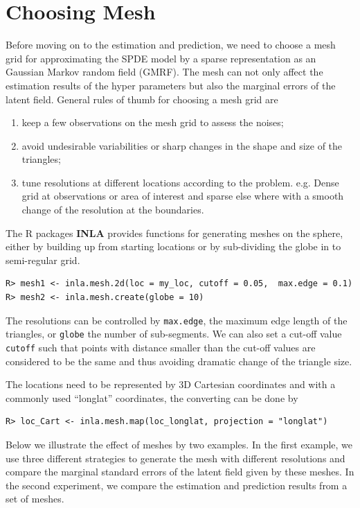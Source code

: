 \documentclass[a4paper,12pt]{article}
\begin{document}
\section{Choosing Mesh}
Before moving on to the estimation and prediction, we need to choose a mesh grid for approximating the SPDE model by a sparse representation as an Gaussian Markov random field (GMRF). The mesh can not only affect the estimation results of the hyper parameters but also the marginal errors of the latent field. General rules of thumb for choosing a mesh grid are 
\begin{enumerate}
\item keep a few observations on the mesh grid to assess the noises;
\item avoid undesirable variabilities or sharp changes in the shape and size of the triangles;
\item tune resolutions at different locations according to the problem. e.g. Dense grid at observations or area of interest and sparse else where with a smooth change of the resolution at the boundaries.
\end{enumerate}

The R packages \textbf{INLA} provides functions for generating meshes on the sphere, either by building up from starting locations or by sub-dividing the globe in to semi-regular grid. 
\begin{verbatim}
R> mesh1 <- inla.mesh.2d(loc = my_loc, cutoff = 0.05,  max.edge = 0.1)
R> mesh2 <- inla.mesh.create(globe = 10)
\end{verbatim}
The resolutions can be controlled by \texttt{max.edge}, the maximum edge length of the triangles, or \texttt{globe} the number of sub-segments. We can also set a cut-off value \texttt{cutoff} such that points with distance smaller than the cut-off values are considered to be the same and thus avoiding dramatic change of the triangle size.

The locations need to be represented by 3D Cartesian coordinates and with a commonly used ``longlat'' coordinates, the converting can be done by 
\begin{verbatim}
R> loc_Cart <- inla.mesh.map(loc_longlat, projection = "longlat")
\end{verbatim} 

Below we illustrate the effect of meshes by two examples. In the first example, we use three different strategies to generate the mesh with different resolutions and compare the marginal standard errors of the latent field given by these meshes. In the second experiment, we compare the estimation and prediction results from a set of meshes.
\end{document}
